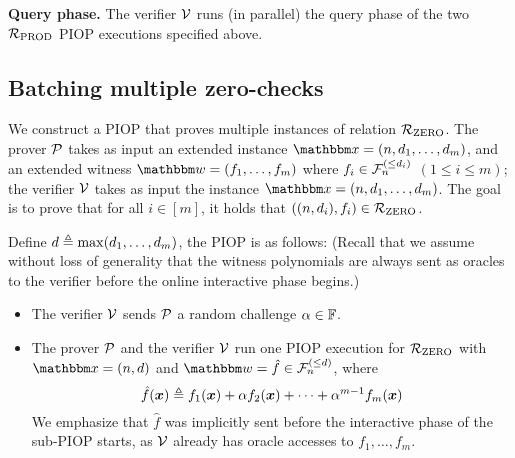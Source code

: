 \textbf{Query phase.}
The verifier $\mathcal{V}$ runs (in parallel) the query phase of the two ${\mathcal{R}}_{\text{PROD}}$ PIOP 
executions specified above.

\subsection{Batching multiple zero-checks}\label{sec:batchrzero}
We construct a PIOP that proves multiple instances of relation ${\mathcal{R}}_{\text{ZERO}}$.
The prover $\mathcal{P}$ takes as input an extended instance $\instR = (n, d_1, \dots, d_m)$,
and an extended witness $\witR = (f_1, \dots, f_m)$ where $f_i \in {\mathcal{F}}_{n}^{(\le{d_i})}$ $(1 \le i \le m)$; 
the verifier $\mathcal{V}$ takes as input the instance $\instR = (n, d_1, \dots, d_m)$.
The goal is to prove that for all $i \in [m]$, it holds that $((n, d_i), f_i) \in {\mathcal{R}}_{\text{ZERO}}$.

Define $d \mathrel{\triangleq} \max(d_1, \dots, d_m)$, the PIOP is as follows: 
(Recall that we assume without loss of generality that the witness polynomials 
are always sent as oracles to the verifier before the online interactive phase begins.)
\begin{itemize}
    \item The verifier $\mathcal{V}$ sends $\mathcal{P}$ a random challenge $\alpha \in \mathbb{F}$.
    \item The prover $\mathcal{P}$ and the verifier $\mathcal{V}$ run one PIOP execution
    for ${\mathcal{R}}_{\text{ZERO}}$ with $\instR = (n, d)$ and $\witR = \hat{f} \in \bdp{n}{d}$, where
    \[
      \hat{f}(\boldsymbol{x}) \mathrel{\triangleq} f_1(\boldsymbol{x}) + \alpha f_2(\boldsymbol{x}) + \dots + \alpha^{m-1} f_m(\boldsymbol{x})
    \]
    We emphasize that $\hat{f}$ was implicitly sent before the interactive phase of the sub-PIOP starts,
    as $\mathcal{V}$ already has oracle accesses to $f_1, \dots, f_m$.
\end{itemize}
